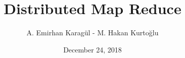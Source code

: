 \documentclass{beamer}
\title[Distributed Map Reduce]{Distributed Map Reduce} %
\author{A. Emirhan Karag\"{u}l - M. Hakan Kurto\u{g}lu} %
\institute[] %
{
Bogazici University \\ %
\medskip
}
\date{December 24, 2018} %
\begin{document}
\begin{frame}
\titlepage %
\end{frame}




\end{document}
